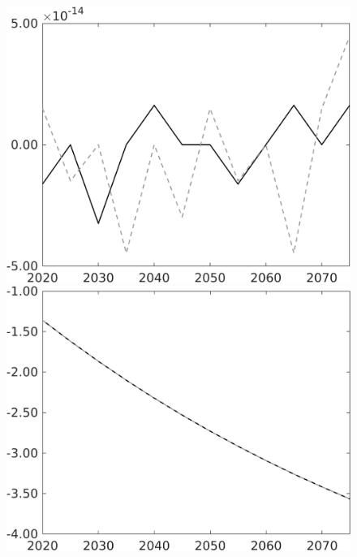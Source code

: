 \documentclass[12pt]{article}
\begin{document}
\begin{figure}[h!!]
\begin{minipage}[]{0.32\textwidth}
	\end{minipage}	
	\begin{minipage}[]{0.32\textwidth}
		\includegraphics[width=1\textwidth]{../../codding_model/own_basedOnFried/optimalPol_010922_revision/figures/all_13Sept22/PerdifNoTauf_regime0_CompTaul_hh_spillover0_nsk1_xgr0_knspil1_sep1_LFlimit0_emsbase0_countec0_GovRev0_etaa0.79_lgd0.png}
	\end{minipage}	
	\begin{minipage}[]{0.32\textwidth}
		\includegraphics[width=1\textwidth]{../../codding_model/own_basedOnFried/optimalPol_010922_revision/figures/all_13Sept22/PerdifNoTauf_regime0_CompTaul_C_spillover0_nsk1_xgr0_knspil1_sep1_LFlimit0_emsbase0_countec0_GovRev0_etaa0.79_lgd0.png}

\end{minipage}
\end{figure}
\end{document}
